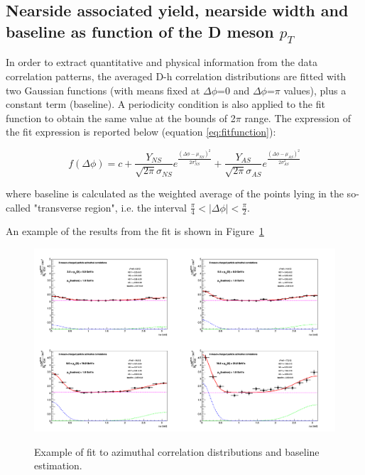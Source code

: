 \subsection{Nearside associated yield, nearside width and baseline as function of the D meson $p_{T}$}


In order to extract quantitative and physical information from the data correlation patterns, the averaged D-h correlation distributions are fitted with two Gaussian functions (with means fixed at $\Delta\phi$=0 and $\Delta\phi$=$\pi$ values), plus a constant term (baseline). A periodicity condition is also applied to the fit function to obtain the same value at the bounds of 2$\pi$ range. The expression of the fit expression is reported below (equation \ref{eq:fitfunction}):

\begin{equation}
f\left(\Delta\phi\right) = c + \frac{Y_{NS}}{\sqrt{2\pi}\sigma_{NS}}e^{\frac{\left(\Delta\phi-\mu_{NS}\right)^{2}}{2\sigma_{NS}^{2}}} + \frac{Y_{AS}}{\sqrt{2\pi}\sigma_{AS}}e^{\frac{\left(\Delta\phi-\mu_{AS}\right)^{2}}{2\sigma_{AS}^{2}}}
\label{eq:fitfunction}
\end{equation}

where baseline is calculated as the weighted average of the points lying in the so-called "transverse region", i.e. the interval $\frac{\pi}{4}<|\Delta\phi|<\frac{\pi}{2}$.

An example of the results from the fit is shown in Figure~\ref{fig:ExFit}

\begin{figure}[h]
\centering
{\includegraphics[width=0.99\linewidth, height=0.70\linewidth]{figures/FitOutput/cFitting_0_pthad1dotto99dot.png}}
\caption{Example of fit to azimuthal correlation distributions and baseline estimation.}
 \label{fig:ExFit}
 \end{figure}

